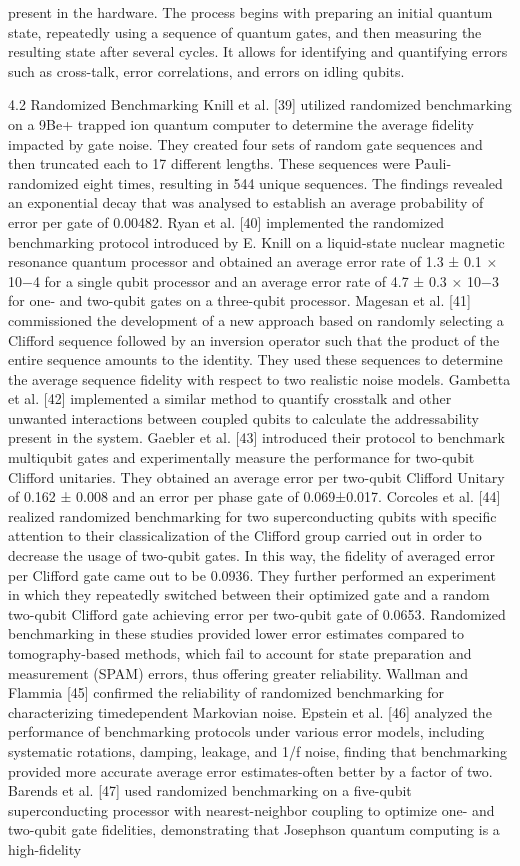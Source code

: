 present in the hardware. The process begins with preparing an initial quantum state, repeatedly using a sequence of quantum gates, and then measuring the resulting state after several cycles. It allows for identifying and quantifying errors such as cross-talk, error correlations, and errors on idling qubits.

4.2 Randomized Benchmarking Knill et al. [39] utilized randomized benchmarking on a 9Be+ trapped ion quantum computer to determine the average fidelity impacted by gate noise. They created four sets of random gate sequences and then truncated each to 17 different lengths. These sequences were Pauli-randomized eight times, resulting in 544 unique sequences. The findings revealed an exponential decay that was analysed to establish an average probability of error per gate of 0.00482. Ryan et al. [40] implemented the randomized benchmarking protocol introduced by E. Knill on a liquid-state nuclear magnetic resonance quantum processor and obtained an average error rate of 1.3 ± 0.1 × 10−4 for a single qubit processor and an average error rate of 4.7 ± 0.3 × 10−3 for one- and two-qubit gates on a three-qubit processor. Magesan et al. [41] commissioned the development of a new approach based on randomly selecting a Clifford sequence followed by an inversion operator such that the product of the entire sequence amounts to the identity. They used these sequences to determine the average sequence fidelity with respect to two realistic noise models. Gambetta et al. [42] implemented a similar method to quantify crosstalk and other unwanted interactions between coupled qubits to calculate the addressability present in the system. Gaebler et al. [43] introduced their protocol to benchmark multiqubit gates and experimentally measure the performance for two-qubit Clifford unitaries. They obtained an average error per two-qubit Clifford Unitary of 0.162 ± 0.008 and an error per phase gate of 0.069±0.017. Corcoles et al. [44] realized randomized benchmarking for two superconducting qubits with specific attention to their classicalization of the Clifford group carried out in order to decrease the usage of two-qubit gates. In this way, the fidelity of averaged error per Clifford gate came out to be 0.0936. They further performed an experiment in which they repeatedly switched between their optimized gate and a random two-qubit Clifford gate achieving error per two-qubit gate of 0.0653. Randomized benchmarking in these studies provided lower error estimates compared to tomography-based methods, which fail to account for state preparation and measurement (SPAM) errors, thus offering greater reliability. Wallman and Flammia [45] confirmed the reliability of randomized benchmarking for characterizing timedependent Markovian noise. Epstein et al. [46] analyzed the performance of benchmarking protocols under various error models, including systematic rotations, damping, leakage, and 1/f noise, finding that benchmarking provided more accurate average error estimates-often better by a factor of two. Barends et al. [47] used randomized benchmarking on a five-qubit superconducting processor with nearest-neighbor coupling to optimize one- and two-qubit gate fidelities, demonstrating that Josephson quantum computing is a high-fidelity 